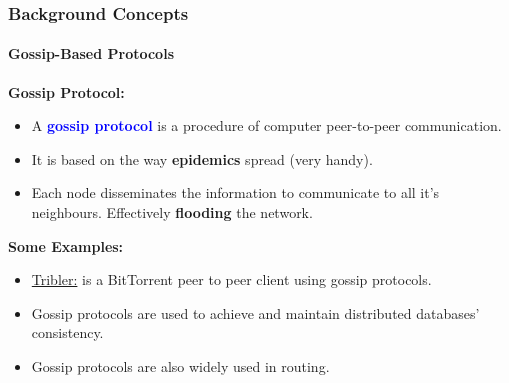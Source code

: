 \documentclass[10pt,    %
    english,            %
    xcolor=table,       %
    envcountsect,        %
    aspectratio=169     %
]{beamer}
\begin{document}
\begin{frame}
    \frametitle{Background Concepts}
    \framesubtitle{Gossip-Based Protocols}

    \textbf{Gossip Protocol:}
    \begin{itemize}
        \item A \textbf{\textcolor{blue}{gossip protocol}} is a procedure of computer peer-to-peer communication.
        \item It is based on the way \textbf{epidemics} spread (very handy).
        \item Each node disseminates the information to communicate to all it's neighbours. Effectively \textbf{flooding} the network.
    \end{itemize}
    \textbf{Some Examples:}
    \begin{itemize}
        \item \href{https://en.wikipedia.org/wiki/Tribler}{Tribler:} is a BitTorrent peer to peer client using gossip protocols.
        \item Gossip protocols are used to achieve and maintain distributed databases' consistency.
        \item Gossip protocols are also widely used in routing.
    \end{itemize}

\end{frame}
\end{document}

